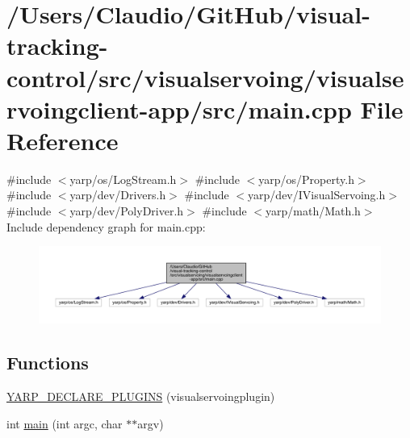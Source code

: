 \hypertarget{visualservoing_2visualservoingclient-app_2src_2main_8cpp}{}\section{/\+Users/\+Claudio/\+Git\+Hub/visual-\/tracking-\/control/src/visualservoing/visualservoingclient-\/app/src/main.cpp File Reference}
\label{visualservoing_2visualservoingclient-app_2src_2main_8cpp}
{\ttfamily \#include $<$yarp/os/\+Log\+Stream.\+h$>$}\newline
{\ttfamily \#include $<$yarp/os/\+Property.\+h$>$}\newline
{\ttfamily \#include $<$yarp/dev/\+Drivers.\+h$>$}\newline
{\ttfamily \#include $<$yarp/dev/\+I\+Visual\+Servoing.\+h$>$}\newline
{\ttfamily \#include $<$yarp/dev/\+Poly\+Driver.\+h$>$}\newline
{\ttfamily \#include $<$yarp/math/\+Math.\+h$>$}\newline
Include dependency graph for main.\+cpp\+:
\nopagebreak
\begin{figure}[H]
\begin{center}
\leavevmode
\includegraphics[width=350pt]{visualservoing_2visualservoingclient-app_2src_2main_8cpp__incl}
\end{center}
\end{figure}
\subsection*{Functions}
\begin{DoxyCompactItemize}
\item 
\hyperlink{visualservoing_2visualservoingclient-app_2src_2main_8cpp_ab543f1556358acb521438f7c30e19de2}{Y\+A\+R\+P\+\_\+\+D\+E\+C\+L\+A\+R\+E\+\_\+\+P\+L\+U\+G\+I\+NS} (visualservoingplugin)
\item 
int \hyperlink{visualservoing_2visualservoingclient-app_2src_2main_8cpp_a3c04138a5bfe5d72780bb7e82a18e627}{main} (int argc, char $\ast$$\ast$argv)
\end{DoxyCompactItemize}


